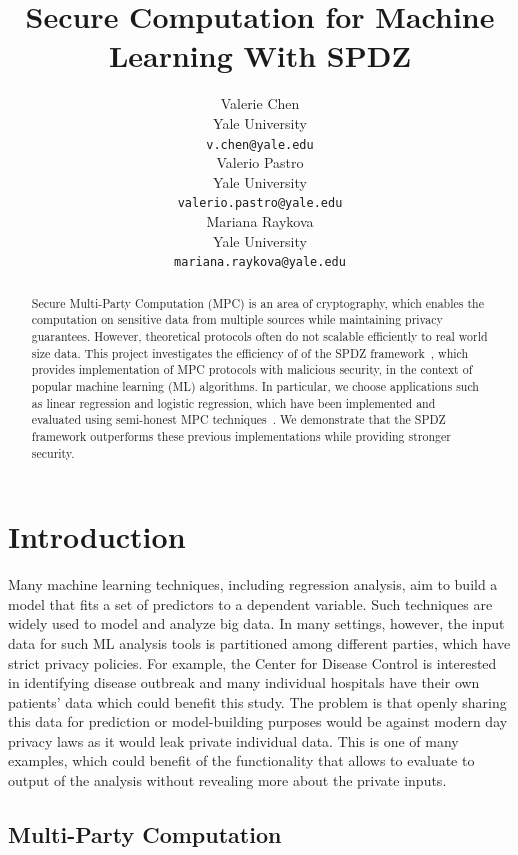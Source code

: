 \documentclass{article}
\title{Secure Computation for Machine Learning With SPDZ}
\author{
  Valerie Chen\\
  Yale University\\
  \texttt{v.chen@yale.edu} \\
  \And
  Valerio Pastro\\
  Yale University\\
  \texttt{valerio.pastro@yale.edu}\\
  \And
  Mariana Raykova \\
  Yale University \\
  \texttt{mariana.raykova@yale.edu} \\
}
\begin{document}
\maketitle

\begin{abstract}
Secure Multi-Party Computation (MPC) is an area of cryptography, which enables the computation on sensitive data from multiple sources while maintaining privacy guarantees.
However, theoretical protocols often do not scalable efficiently to real world size data. This project investigates the efficiency of of the SPDZ framework~\cite{SPDZ12}, which provides implementation
of MPC protocols with malicious security, in the context of popular machine learning (ML) algorithms. In particular, we choose applications such as linear regression and logistic regression,
which have been implemented and evaluated using semi-honest MPC techniques~\cite{GSB0DZE17, MZ17}. We demonstrate that the SPDZ framework outperforms these previous implementations while providing stronger security.
\end{abstract}


\section{Introduction}

Many machine learning techniques, including regression analysis, aim to build a model that fits a set of predictors to a dependent variable. Such techniques are widely used to model and analyze big data.
In many settings, however, the input data for such ML analysis tools is partitioned among different parties, which have strict privacy policies. For example, the Center for Disease Control is interested in identifying disease outbreak and many individual hospitals have their own patients' data which could benefit this study. The problem is that openly sharing this data for prediction or model-building purposes would be against modern day privacy laws as it would leak private individual data. This is one of many examples, which could benefit of the functionality that allows to evaluate to output of the analysis without revealing more about the private inputs.

\subsection{Multi-Party Computation}
\end{document}
